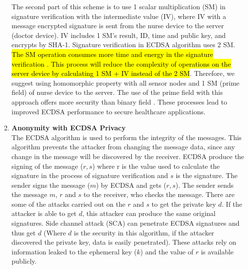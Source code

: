 \documentclass[a4paper,11pt]{article}
\DeclareRobustCommand{\hlyellow}[1]{{\sethlcolor{white}\hl{#1}}}
\begin{document}
\begin{enumerate}
The second part of this scheme is to use 1 scalar multiplication (SM) in signature verification with the intermediate value (IV), where IV with a message encrypted signature is sent from the nurse device to the server (doctor device). IV includes 1 SM's result, ID, time and public key, and encrypts by SHA-1. Signature verification in ECDSA algorithm uses 2 SM. \hlyellow{The SM operation consumes more time and energy in the signature verification \cite{p17, p46}. This process will reduce the complexity of operations on the server device by calculating 1 SM + IV instead of the 2 SM}. Therefore, we suggest using homomorphic property with all sensor nodes and 1 SM (prime field) of nurse device to the server. The use of the prime field with this approach offers more security than binary field \cite{p26}. These processes lead to improved ECDSA performance to secure healthcare applications.

\item \textbf{Anonymity with ECDSA Privacy}\\
The ECDSA algorithm is used to perform the integrity of the messages. This algorithm prevents the attacker from changing the message data, since any change in the message will be discovered by the receiver. ECDSA produce the signing of the message ($r,s$) where r is the value used to calculate the signature in the process of signature verification and $s$ is the signature.
The sender signs the message ($m$) by ECDSA and gets ($r,s$). The sender sends the message $m$, $r$ and $s$ to the receiver, who checks the message. There are some of the attacks carried out on the $r$ and $s$ to get the private key $d$. If the attacker is able to get $d$, this attacker can produce the same original signatures. Side channel attack (SCA) can penetrate ECDSA signatures and thus get $d$ (Where $d$ is the security in this algorithm, if the attacker discovered the private key, data is easily penetrated). These attacks rely on information leaked to the ephemeral key ($k$) and the value of $r$ is available publicly. 


\end{enumerate}
\end{document}
